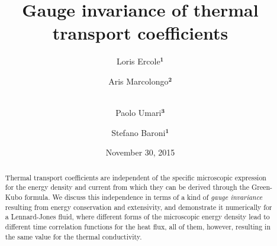 \title{Gauge invariance of thermal transport coefficients}

\author{Loris Ercole$^\mathbf{1}$ \and Aris Marcolongo$^\mathbf{2}$
  \and \\ Paolo Umari$^\mathbf{3}$ \and 
  Stefano Baroni$^\mathbf{1}$ }

\dedication{This paper is dedicated to our friend and distinguished colleague
Flavio Toigo, a long-time enthusiast of hydrodynamic fluctuations,
on the occasion of his seventieth birthday.}


\date{November 30, 2015}
\maketitle

\begin{abstract}
  Thermal transport coefficients are independent of the specific
  microscopic expression for the energy density and current from which
  they can be derived through the Green-Kubo formula. We discuss
  this independence in terms of a kind of \emph{gauge invariance
  }resulting from energy conservation and extensivity, and demonstrate
  it numerically for a Lennard-Jones fluid, where different forms of
  the microscopic energy density lead to different time correlation
  functions for the heat flux, all of them, however, resulting in the
  same value for the thermal conductivity.   
\end{abstract}

